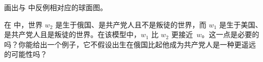 \documentclass[../../../include/open-logic-section]{subfiles}
\begin{document}
\begin{prob}
画出与  中反例相对应的球面图。
\end{prob}

\begin{prob}
  在  中，世界 $w_2$ 是生于俄国、是共产党人且不是叛徒的世界，而
  $w_1$ 是生于美国、是共产党人且是叛徒的世界。在该模型中，$w_1$ 比 $w_2$
  更接近~$w$。这一点是必要的吗？你能给出一个例子，它不假设出生在俄国比起他成为共产党人是一种更遥远
  的可能性吗？
\end{prob}
\end{document}
